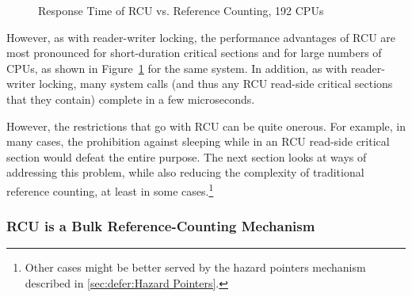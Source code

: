 \begin{figure}[tb]
\centering
{}
\caption{Response Time of RCU vs. Reference Counting, 192 CPUs}
\label{fig:defer:Response Time of RCU vs. Reference Counting}
\end{figure}

However, as with reader-writer locking, the performance advantages of
RCU are most pronounced for short-duration critical sections and for
large numbers of CPUs, as shown in
Figure~\ref{fig:defer:Response Time of RCU vs. Reference Counting}
for the same system.
In addition, as with reader-writer locking, many system calls (and thus
any RCU read-side critical sections that they contain) complete in
a few microseconds.

However, the restrictions that go with RCU can be quite onerous.
For example, in many cases, the prohibition against sleeping while in an RCU
read-side critical section would defeat the entire purpose.
The next section looks at ways of addressing this problem, while also
reducing the complexity of traditional reference counting, at least in
some cases.\footnote{
	Other cases might be better served by the hazard pointers
	mechanism described in \cref{sec:defer:Hazard Pointers}.}

\subsubsection{RCU is a Bulk Reference-Counting Mechanism}
\label{sec:defer:RCU is a Bulk Reference-Counting Mechanism}

